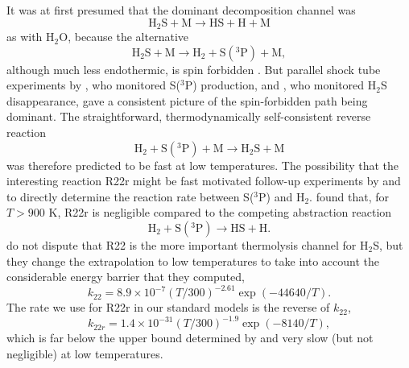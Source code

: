 \documentclass[preprint]{aastex}
\newcounter{reaction}
\begin{document}
 It was at first presumed that the dominant decomposition channel was 
\begin{equation}  \tag{R21}
 \mathrm{H}_2\mathrm{S} + \mathrm{M} \rightarrow  \mathrm{HS} + \mathrm{H} + \mathrm{M}   
\end{equation} 
as with H$_2$O, because the alternative
 \begin{equation}\tag{R22}
 \mathrm{H}_2\mathrm{S} + \mathrm{M} \rightarrow  \mathrm{H}_2 + \mathrm{S}(^3\mathrm{P}) + \mathrm{M} , 
 \end{equation}
although much less endothermic, is spin forbidden \citep{Roth1982}.
But parallel shock tube experiments by \citet{Woiki1994}, who monitored S($^3$P) production, 
and \citet{Olschewski1994}, who monitored H$_2$S disappearance, gave a consistent picture
of the spin-forbidden path being dominant.
The straightforward, thermodynamically self-consistent reverse reaction 
 \begin{equation}\tag{R22r}
 \mathrm{H}_2 + \mathrm{S}(^3\mathrm{P}) + \mathrm{M} \rightarrow  \mathrm{H}_2\mathrm{S} + \mathrm{M}  
 \end{equation}
 was therefore predicted to be fast at low temperatures. 
% 
The possibility that the interesting reaction R22r might be fast 
motivated follow-up experiments by \citet{Woiki1995a} and \citet{Shiina1996,Shiina1998} to directly determine the reaction rate
between S($^3$P) and H$_2$. 
\citet{Shiina1998} found that, for $T>900$ K, R22r is negligible compared to the competing abstraction
reaction 
 \begin{equation}\tag{R9r}
 \mathrm{H}_2 + \mathrm{S}(^3\mathrm{P}) \rightarrow  \mathrm{HS} + \mathrm{H}.
 \end{equation}
\citet{Shiina1998} do not dispute that R22 is the more important thermolysis channel for H$_2$S,
but they change the extrapolation to low
temperatures to take into account the considerable energy barrier that they computed,
\begin{equation}
\label{k22}
k_{22} = 8.9\times 10^{-7} \left(T/300\right)^{-2.61} \exp{\left(-44640/T\right)} .
\end{equation}   
The rate we use for R22r in our standard models is the reverse of $k_{22}$,  
\begin{equation}
\label{k22r}
k_{22r} = 1.4\times 10^{-31} \left(T/300\right)^{-1.9} \exp{\left(-8140/T\right)},
\end{equation}   
which is far below the upper bound determined by \citet{Shiina1998}
and very slow (but not negligible) at low temperatures.  
\end{document}
